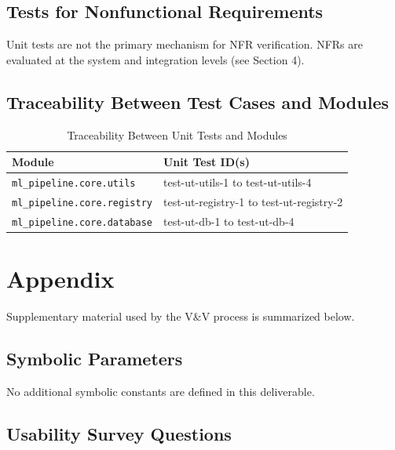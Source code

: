 \documentclass[12pt, titlepage]{article}
\begin{document}
\subsection{Tests for Nonfunctional Requirements}

Unit tests are not the primary mechanism for NFR verification. NFRs are evaluated at the system and integration levels (see Section 4).

\subsection{Traceability Between Test Cases and Modules}

\begin{table}[ht]
    \centering
    \begin{tabular}{|p{5cm}|p{7cm}|}
        \hline
        \textbf{Module} & \textbf{Unit Test ID(s)} \\
        \hline
        \texttt{ml\_pipeline.core.utils} & test-ut-utils-1 to test-ut-utils-4 \\
        \hline
        \texttt{ml\_pipeline.core.registry} & test-ut-registry-1 to test-ut-registry-2 \\
        \hline
        \texttt{ml\_pipeline.core.database} & test-ut-db-1 to test-ut-db-4 \\
        \hline
    \end{tabular}
    \caption{Traceability Between Unit Tests and Modules}
\end{table}
				




\newpage

\section{Appendix}

Supplementary material used by the V\&V process is summarized below.

\subsection{Symbolic Parameters}

No additional symbolic constants are defined in this deliverable.

\subsection{Usability Survey Questions}
\end{document}
